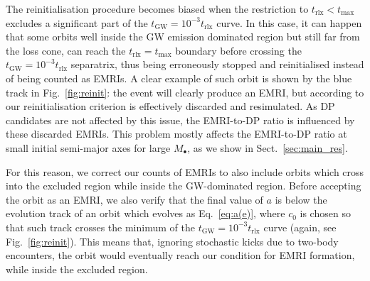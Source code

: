 \documentclass[desactivate]{aa}
\begin{document}
        The reinitialisation procedure becomes biased when the restriction to $t_\mathrm{rlx} < t_\mathrm{max}$ excludes a significant part of the $t_\mathrm{GW} = 10^{-3} t_\mathrm{rlx}$ curve. In this case, it can happen that some orbits well inside the GW emission dominated region but still far from the loss cone, can reach the $t_\mathrm{rlx} = t_\mathrm{max}$ boundary before crossing the $t_\mathrm{GW} = 10^{-3}t_\mathrm{rlx}$ separatrix, thus being erroneously stopped and reinitialised instead of being counted as EMRIs. A clear example of such orbit is shown by the blue track in Fig.\ \ref{fig:reinit}: the event will clearly produce an EMRI, but according to our reinitialisation criterion is effectively discarded and resimulated.        
        As DP candidates are not affected by this issue, the EMRI-to-DP ratio is influenced by these discarded EMRIs. This problem mostly affects the EMRI-to-DP ratio at small initial semi-major axes for large $M_\bullet$, as we show in Sect.\ \ref{sec:main_res}.

        For this reason, we correct our counts of EMRIs to also include orbits which cross into the excluded region while inside the GW-dominated region. Before accepting the orbit as an EMRI, we also verify that the final value of $a$ is below the evolution track of an orbit which evolves as Eq.\ \eqref{eq:a(e)}, where $c_0$ is chosen so that such track crosses the minimum of the $t_\mathrm{GW} = 10^{-3} t_\mathrm{rlx}$ curve (again, see Fig.\ \ref{fig:reinit}).
        This means that, ignoring stochastic kicks due to two-body encounters, the orbit would eventually reach our condition for EMRI formation, while inside the excluded region. 
\end{document}
